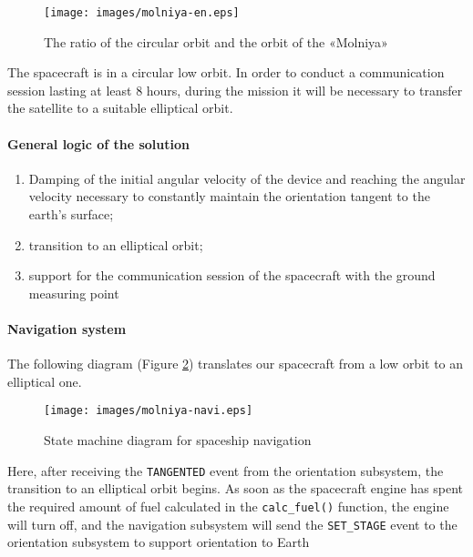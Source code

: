 \documentclass[12pt,a4paper]{article}
\begin{document}
\begin{figure}[tbh]
  \begin{center}
    \texttt{[image: images/molniya-en.eps]}
    \caption{The ratio of the circular orbit and the orbit of the «Molniya»}
    \label{Pic:Molniya-en}
  \end{center}
\end{figure}

The spacecraft is in a circular low orbit. In order to conduct a communication session lasting at least 8 hours, during the mission it will be necessary to transfer the satellite to a suitable elliptical
orbit.

\clearpage
\paragraph{General logic of the solution} 

\begin{enumerate}
\item Damping of the initial angular velocity of the device and reaching the angular velocity necessary to constantly maintain the orientation tangent to the earth's surface;
\item transition to an elliptical orbit;
\item support for the communication session of the spacecraft with the ground measuring point
\end{enumerate}

\paragraph{Navigation system} The following diagram (Figure \ref{Pic:Molniya-navi-en}) translates our spacecraft from a low orbit to an elliptical one.

\begin{figure}[tbh]
  \begin{center}
    \texttt{[image: images/molniya-navi.eps]}
    \caption{State machine diagram for spaceship navigation}
    \label{Pic:Molniya-navi-en}
  \end{center}
\end{figure}

Here, after receiving the \verb'TANGENTED' event from the orientation subsystem, the transition to an elliptical orbit begins. As soon as the spacecraft engine has spent the required amount of fuel calculated in the \verb'calc_fuel()' function, the engine will turn off, and the navigation subsystem will send the \verb'SET_STAGE' event to the orientation subsystem to support orientation to Earth
\end{document}
